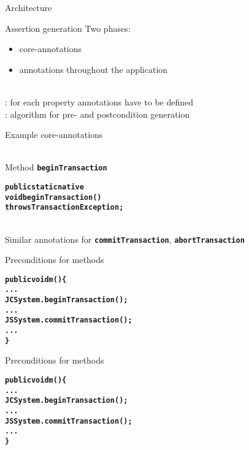 \documentclass[final,nocolorBG,a4,marieke,nototal,pdf, accumulate,slideColor]{prosper}
\newcommand{\textttbf}[1]{\texttt{\textbf{#1}}}
\begin{document}
\begin{slide}{Architecture}
\end{slide}

\begin{slide}{Assertion generation}
Two phases:
\begin{itemize}
\item {} core-annotations
\item {} annotations throughout the application
\end{itemize}
\ \smallskip\\
: for each property annotations have to be defined
\bigskip\\
: algorithm for pre- and postcondition generation
\end{slide}

\begin{slide}{Example core-annotations}
\begin{alltt}
\end{alltt}
\ \smallskip\\
Method \textttbf{beginTransaction}
\begin{alltt}
\textbf{public static native 
   void beginTransaction() 
        throws TransactionException;}
\end{alltt}
\ \smallskip\\
Similar annotations for \textttbf{commitTransaction},
\textttbf{abortTransaction} 
\end{slide}


\begin{slide}{Preconditions for methods}
\begin{alltt}
\textbf{public void m() \{
   ...
   JCSystem.beginTransaction();
   ...
   JSSystem.commitTransaction();
   ...
   \}}
\end{alltt}
\end{slide}

\begin{slide}{Preconditions for methods}
\begin{alltt}
\textbf{public void m() \{
   ...
   JCSystem.beginTransaction();
   ...
   JSSystem.commitTransaction();
   ...
   \}}
\end{alltt}
\ \smallskip\\
\end{slide}
\end{document}
